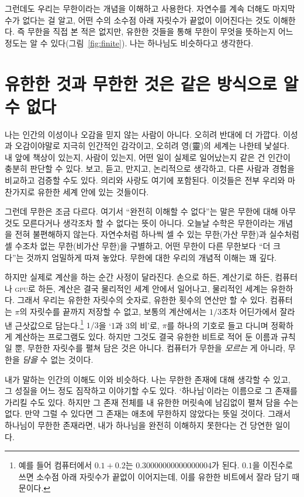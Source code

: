 \documentclass[11pt]{article}
\begin{document}
그런데도 우리는 무한이라는 개념을 이해하고 사용한다. 자연수를 계속 더해도
마지막 수가 없다는 걸 알고, 어떤 수의 소수점 아래 자릿수가 끝없이 이어진다는
것도 이해한다. 즉 무한을 직접 본 적은 없지만, 유한한 것들을 통해 무한이 무엇을
뜻하는지 어느 정도는 알 수 있다(그림~\ref{fig:finite}).
나는 하나님도 비슷하다고 생각한다.

\section{유한한 것과 무한한 것은 같은 방식으로 알 수 없다}

나는 인간의 이성이나 오감을 믿지 않는 사람이 아니다. 오히려 반대에 더 가깝다.
이성과 오감이야말로 지극히 인간적인 감각이고, 오히려 영(靈)의
세계는 나한테 낯설다. 내 앞에 책상이 있는지, 사람이 있는지, 어떤 일이 실제로
일어났는지 같은 건 인간이 충분히 판단할 수 있다. 보고, 듣고, 만지고,
논리적으로 생각하고, 다른 사람과 경험을 비교하고 검증할 수도 있다. 의리와
사랑도 여기에 포함된다. 이것들은
전부 우리와 마찬가지로 유한한 세계 안에 있는 것들이다.

그런데 무한은 조금 다르다. 여기서 “완전히 이해할 수 없다”는 말은 무한에 대해
아무것도 모른다거나 생각조차 할 수 없다는 뜻이 아니다. 오늘날 수학은 무한이라는
개념을 전혀 불편해하지 않는다. 자연수처럼 하나씩 셀 수 있는 무한(가산 무한)과
실수처럼 셀 수조차 없는 무한(비가산 무한)을 구별하고, 어떤 무한이 다른 무한보다
“더 크다”는 것까지 엄밀하게 따져 놓았다. 무한에 대한 우리의 개념적 이해는 꽤
깊다.

하지만 실제로 계산을 하는 순간 사정이 달라진다. 손으로 하든, 계산기로 하든,
컴퓨터나 \textsc{gpu}로 하든, 계산은 결국 물리적인 세계 안에서 일어나고, 물리적인
세계는 유한하다. 그래서 우리는 유한한 자릿수의 숫자로, 유한한 횟수의 연산만 할
수 있다. 컴퓨터는 $\pi$의 자릿수를 끝까지 저장할 수 없고, 보통의 계산에서는
$1/3$조차 어딘가에서 잘라낸 근삿값으로 담는다.\footnote{예를 들어 컴퓨터에서
$0.1 + 0.2$는 $0.300000000\allowbreak 00000004$가 된다. $0.1$을 이진수로 쓰면 소수점 아래
자릿수가 끝없이 이어지는데, 이를 유한한 비트에서 잘라 담기 때문이다.}
$1/3$을 ‘1과 3의 비’로, $\pi$를 하나의 기호로 들고 다니며 정확하게
계산하는 프로그램도 있다. 하지만 그것도 결국 유한한 비트로 적어 둔 이름과
규칙일 뿐, 무한한 자릿수를 펼쳐 담은 것은 아니다. 컴퓨터가 무한을
\emph{모르는} 게 아니라, 무한을 \emph{담을} 수 없는 것이다.

내가 말하는 인간의 이해도 이와 비슷하다. 나는 무한한 존재에 대해 생각할 수 있고,
그 성질을 어느 정도 짐작하고 이야기할 수도 있다. ‘하나님’이라는 이름으로 그
존재를 가리킬 수도 있다. 하지만 그 존재 전체를 내 유한한 머릿속에 남김없이
펼쳐 담을 수는 없다. 만약 그럴 수 있다면 그 존재는 애초에 무한하지 않았다는
뜻일 것이다. 그래서 하나님이 무한한 존재라면, 내가 하나님을 완전히 이해하지
못한다는 건 당연한 일이다.
\end{document}
